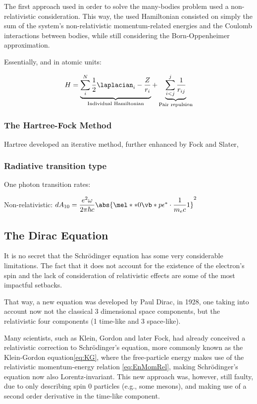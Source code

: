 The first approach used in order to solve the many-bodies problem used a non-relativistic consideration. This way, the used Hamiltonian consisted on simply the sum of the system's non-relativistic momentum-related energies and the Coulomb interactions between bodies, while still considering the Born-Oppenheimer approximation.

Essentially, and in atomic units:

\begin{equation}
    H= \underbrace{\displaystyle\sum_i^N \dfrac{1}{2}\laplacian_i  -\frac{Z}{r_i}}_{\text{Individual Hamiltonian}} + \underbrace{\sum_{i<j}^{j}\dfrac{1}{r_{ij}}}_{\text{Pair repulsion}}
\end{equation}

\subsubsection{The Hartree-Fock Method}

Hartree developed an iterative method, further enhanced by Fock and Slater,

\subsubsection{Radiative transition type}

One photon transition rates:

Non-relativistic: $dA_{10}=\dfrac{e^2 \omega}{2\pi \hbar c}\abs{\mel**{0}{ \vb*{p\epsilon}^*\cdot\dfrac{1}{m_e c}}{1}}^2$

\subsection{The Dirac Equation}

It is no secret that the Schrödinger equation has some very considerable limitations. The fact that it does not account for the existence of the electron's spin and the lack of consideration of relativistic effects are some of the most impactful setbacks.

That way, a new equation was developed by Paul Dirac, in 1928\cite{Dirac}, one taking into account now not the classical 3 dimensional space components, but the relativistic four components (1 time-like and 3 space-like).

Many scientists, such as Klein, Gordon and later Fock, had already conceived a relativistic correction to Schrödinger's equation, more commonly known as the Klein-Gordon equation\eqref{eq:KG}, where the free-particle energy makes use of the relativistic momentum-energy relation \eqref{eq:EnMomRel}, making Schrödinger's equation now also Lorentz-invariant.
 This new approach was, however, still faulty, due to only describing spin 0 particles (e.g., some mesons), and making use of a second order derivative in the time-like component.

